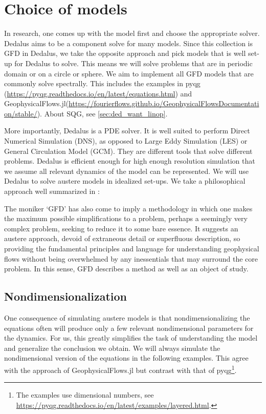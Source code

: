 \section{Choice of models}
In research, one comes up with the model first and choose the appropriate solver. Dedalus aims to be a component solve for many models. Since this collection is GFD in Dedalus, we take the opposite approach and pick models that is well set-up for Dedalus to solve. This means we will solve problems that are in periodic domain or on a circle or sphere. We aim to implement all GFD models that are commonly solve spectrally. This includes the examples in pyqg (\url{https://pyqg.readthedocs.io/en/latest/equations.html}) and GeophysicalFlows.jl(\url{https://fourierflows.github.io/GeophysicalFlowsDocumentation/stable/}). About SQG, see \ref{sec:ded_want_linop}.

More importantly, Dedalus is a PDE solver. It is well suited to perform Direct Numerical Simulation (DNS), as opposed to Large Eddy Simulation (LES) or General Circulation Model (GCM). They are different tools that solve different problems. Dedalus is efficient enough for high enough resolution simulation that we assume all relevant dynamics of the model can be represented. We will use Dedalus to solve austere models in idealized set-ups. We take a philosophical approach well summarized in \cite{Vallis_16}:
\begin{displayquote}
    The moniker ‘GFD’ has also come to imply a methodology in which one makes the maximum possible simplifications to a problem, perhaps a seemingly very complex problem, seeking to reduce it to some bare essence. It suggests an austere approach, devoid of extraneous detail or superfluous description, so providing the fundamental principles and language for understanding geophysical flows without being overwhelmed by any inessentials that may surround the core problem. In this sense, GFD describes a method as well as an object of study.
\end{displayquote}

\subsection{Nondimensionalization}
\newcommand{\Ro}{\{\text{Ro}\}}
\newcommand{\Fr}{\{\text{Fr}\}}
\newcommand{\Ub}{\left\{\frac{\text{Fr}^2}{\text{Ro}^2}\right\}}
\newcommand{\Bu}{\left\{\frac{\text{Ro}^2}{\text{Fr}^2}\right\}}

One consequence of simulating austere models is that nondimensionalizing the equations often will produce only a few relevant nondimensional parameters for the dynamics. For us, this greatly simplifies the task of understanding the model and generalize the conclusion we obtain. We will always simulate the nondimensional version of the equations in the following examples. This agree with the approach of GeophysicalFlows.jl but contrast with that of pyqg\footnote{The examples use dimensional numbers, see \url{https://pyqg.readthedocs.io/en/latest/examples/layered.html}.}. 


